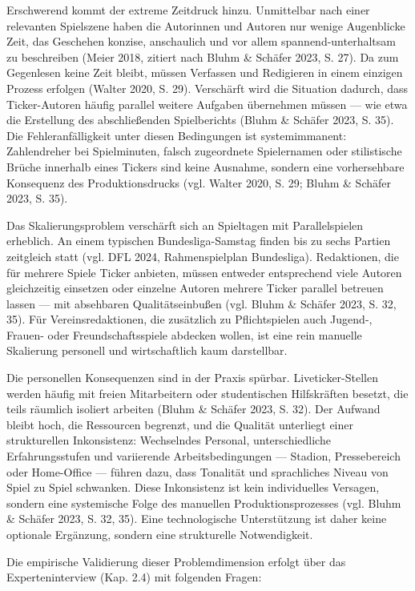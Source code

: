 Erschwerend kommt der extreme Zeitdruck hinzu. Unmittelbar nach einer
relevanten Spielszene haben die Autorinnen und Autoren nur wenige
Augenblicke Zeit, das Geschehen konzise, anschaulich und vor allem
spannend-unterhaltsam zu beschreiben (Meier 2018, zitiert nach Bluhm \&
Schäfer 2023, S. 27). Da zum Gegenlesen keine Zeit bleibt, müssen
Verfassen und Redigieren in einem einzigen Prozess erfolgen (Walter
2020, S. 29). Verschärft wird die Situation dadurch, dass Ticker-Autoren
häufig parallel weitere Aufgaben übernehmen müssen --- wie etwa die
Erstellung des abschließenden Spielberichts (Bluhm \& Schäfer 2023, S.
35). Die Fehleranfälligkeit unter diesen Bedingungen ist systemimmanent:
Zahlendreher bei Spielminuten, falsch zugeordnete Spielernamen oder
stilistische Brüche innerhalb eines Tickers sind keine Ausnahme, sondern
eine vorhersehbare Konsequenz des Produktionsdrucks (vgl. Walter 2020,
S. 29; Bluhm \& Schäfer 2023, S. 35).

Das Skalierungsproblem verschärft sich an Spieltagen mit Parallelspielen
erheblich. An einem typischen Bundesliga-Samstag finden bis zu sechs
Partien zeitgleich statt (vgl. DFL 2024, Rahmenspielplan Bundesliga).
Redaktionen, die für mehrere Spiele Ticker anbieten, müssen entweder
entsprechend viele Autoren gleichzeitig einsetzen oder einzelne Autoren
mehrere Ticker parallel betreuen lassen --- mit absehbaren
Qualitätseinbußen (vgl. Bluhm \& Schäfer 2023, S. 32, 35). Für
Vereinsredaktionen, die zusätzlich zu Pflichtspielen auch Jugend-,
Frauen- oder Freundschaftsspiele abdecken wollen, ist eine rein manuelle
Skalierung personell und wirtschaftlich kaum darstellbar.

Die personellen Konsequenzen sind in der Praxis spürbar.
Liveticker-Stellen werden häufig mit freien Mitarbeitern oder
studentischen Hilfskräften besetzt, die teils räumlich isoliert arbeiten
(Bluhm \& Schäfer 2023, S. 32). Der Aufwand bleibt hoch, die Ressourcen
begrenzt, und die Qualität unterliegt einer strukturellen Inkonsistenz:
Wechselndes Personal, unterschiedliche Erfahrungsstufen und variierende
Arbeitsbedingungen --- Stadion, Pressebereich oder Home-Office ---
führen dazu, dass Tonalität und sprachliches Niveau von Spiel zu Spiel
schwanken. Diese Inkonsistenz ist kein individuelles Versagen, sondern
eine systemische Folge des manuellen Produktionsprozesses (vgl. Bluhm \&
Schäfer 2023, S. 32, 35). Eine technologische Unterstützung ist daher
keine optionale Ergänzung, sondern eine strukturelle Notwendigkeit.

Die empirische Validierung dieser Problemdimension erfolgt über das
Experteninterview (Kap. 2.4) mit folgenden Fragen:

